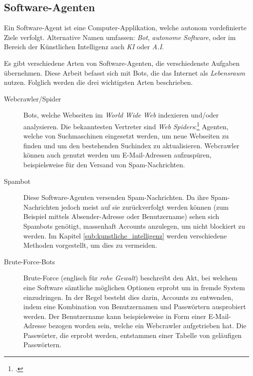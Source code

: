 \subsection{Software-Agenten}
\label{sub:software_agenten}

Ein Software-Agent ist eine Computer-Applikation, welche autonom vordefinierte
Ziele verfolgt. Alternative Namen umfassen: \emph{Bot}, \emph{autonome
Software}, oder im Bereich der Künstlichen Intelligenz auch \emph{KI} oder
\emph{A.I}.

Es gibt verschiedene Arten von Software-Agenten, die verschiedenste Aufgaben
übernehmen. Diese Arbeit befasst sich mit Bots, die das Internet als
\emph{Lebensraum} nutzen. Folglich werden die drei wichtigsten Arten
beschrieben.

\begin{description}
  \item[Webcrawler/Spider]\label{term:spider}
  Bots, welche Webseiten im \emph{World Wide Web} indexieren und/oder
  analysieren. Die bekanntesten Vertreter sind \emph{Web
  Spiders}:\footcite{wa:tkWWWRobot} Agenten, welche von Suchmaschinen eingesetzt
  werden, um neue Webseiten zu finden und um den bestehenden Suchindex zu
  aktualisieren. Webcrawler können auch genutzt werden um E-Mail-Adressen
  aufzuspüren, beispielsweise für den Versand von Spam-Nachrichten.
  
  \item[Spambot]
  Diese Software-Agenten versenden Spam-Nachrichten. Da ihre Spam-Nachrichten
  jedoch meist auf sie zurückverfolgt werden können (zum Beispiel mittels
  Absender-Adresse oder Benutzername) sehen sich Spambots genötigt, massenhaft
  Accounts anzulegen, um nicht blockiert zu werden. Im Kapitel
  \ref{sub:kunstliche_intelligenz} werden verschiedene Methoden vorgestellt, um
  dies zu vermeiden.
  
  \item[Brute-Force-Bots]
  Brute-Force (englisch für \emph{rohe Gewalt}) beschreibt den Akt, bei welchem
  eine Software sämtliche möglichen Optionen erprobt um in fremde System
  einzudringen. In der Regel besteht dies darin, Accounts zu entwenden, indem
  eine Kombination von Benutzernamen und Passwörtern ausprobiert werden. Der
  Benutzername kann beispielsweise in Form einer E-Mail-Adresse bezogen worden
  sein, welche ein Webcrawler aufgetrieben hat. Die Passwörter, die erprobt
  werden, entstammen einer Tabelle von geläufigen Passwörtern.
\end{description}
